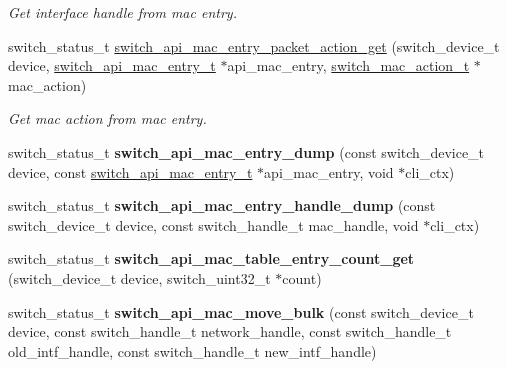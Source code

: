 \begin{DoxyCompactItemize}
\begin{DoxyCompactList}\small\item\em Get interface handle from mac entry. \end{DoxyCompactList}\item 
switch\+\_\+status\+\_\+t \hyperlink{group__L2_gacc5079697b52baf49a3a786060bc2a34}{switch\+\_\+api\+\_\+mac\+\_\+entry\+\_\+packet\+\_\+action\+\_\+get} (switch\+\_\+device\+\_\+t device, \hyperlink{group__L2_ga2fde8bafec6b710770603b5cde2f94af}{switch\+\_\+api\+\_\+mac\+\_\+entry\+\_\+t} $\ast$api\+\_\+mac\+\_\+entry, \hyperlink{group__L2_ga81675f7440ac9d8c53f957e4ec214cb1}{switch\+\_\+mac\+\_\+action\+\_\+t} $\ast$mac\+\_\+action)
\begin{DoxyCompactList}\small\item\em Get mac action from mac entry. \end{DoxyCompactList}\item 
\hypertarget{group__L2_gafd075cdb4a92b3e2708954b8f09d7a64}{switch\+\_\+status\+\_\+t {\bfseries switch\+\_\+api\+\_\+mac\+\_\+entry\+\_\+dump} (const switch\+\_\+device\+\_\+t device, const \hyperlink{group__L2_ga2fde8bafec6b710770603b5cde2f94af}{switch\+\_\+api\+\_\+mac\+\_\+entry\+\_\+t} $\ast$api\+\_\+mac\+\_\+entry, void $\ast$cli\+\_\+ctx)}\label{group__L2_gafd075cdb4a92b3e2708954b8f09d7a64}

\item 
\hypertarget{group__L2_ga4f1baa386afd6805da236d0121860159}{switch\+\_\+status\+\_\+t {\bfseries switch\+\_\+api\+\_\+mac\+\_\+entry\+\_\+handle\+\_\+dump} (const switch\+\_\+device\+\_\+t device, const switch\+\_\+handle\+\_\+t mac\+\_\+handle, void $\ast$cli\+\_\+ctx)}\label{group__L2_ga4f1baa386afd6805da236d0121860159}

\item 
\hypertarget{group__L2_ga2ef720730e2ba58333041200490c64a9}{switch\+\_\+status\+\_\+t {\bfseries switch\+\_\+api\+\_\+mac\+\_\+table\+\_\+entry\+\_\+count\+\_\+get} (switch\+\_\+device\+\_\+t device, switch\+\_\+uint32\+\_\+t $\ast$count)}\label{group__L2_ga2ef720730e2ba58333041200490c64a9}

\item 
\hypertarget{group__L2_gaa22c0e9cfd1902d40059c5b5002d172c}{switch\+\_\+status\+\_\+t {\bfseries switch\+\_\+api\+\_\+mac\+\_\+move\+\_\+bulk} (const switch\+\_\+device\+\_\+t device, const switch\+\_\+handle\+\_\+t network\+\_\+handle, const switch\+\_\+handle\+\_\+t old\+\_\+intf\+\_\+handle, const switch\+\_\+handle\+\_\+t new\+\_\+intf\+\_\+handle)}\label{group__L2_gaa22c0e9cfd1902d40059c5b5002d172c}

\end{DoxyCompactItemize}



